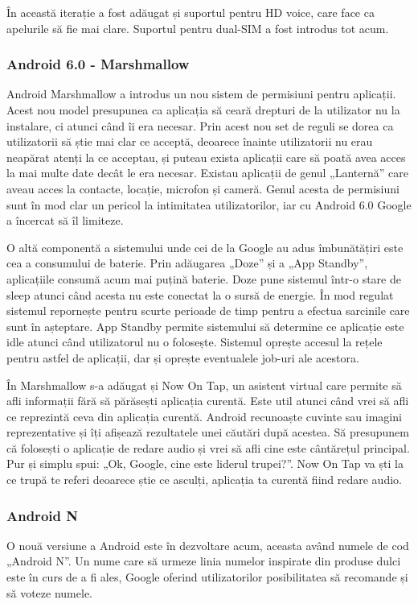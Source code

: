 \documentclass[12pt,a4paper]{article}
\begin{document}
	În această iterație a fost adăugat și suportul pentru HD voice, care face ca apelurile să fie mai clare. Suportul pentru dual-SIM a fost introdus tot acum.

	
\subsubsection{Android 6.0 - Marshmallow}
Android Marshmallow a introdus un nou sistem de permisiuni pentru aplicații. Acest nou model presupunea ca aplicația să ceară drepturi de la utilizator nu la instalare, ci atunci când îi era necesar. Prin acest nou set de reguli se dorea ca utilizatorii să știe mai clar ce acceptă, deoarece înainte utilizatorii nu erau neapărat atenți la ce acceptau, și puteau exista aplicații care să poată avea acces la mai multe date decât le era necesar. Existau aplicații de genul „Lanternă” care aveau acces la contacte, locație, microfon și cameră. Genul acesta de permisiuni sunt în mod clar un pericol la intimitatea utilizatorilor, iar cu Android 6.0 Google a încercat să îl limiteze.

	O altă componentă a sistemului unde cei de la Google au adus îmbunătățiri este cea a consumului de baterie. Prin adăugarea „Doze” și a „App Standby”, aplicațiile consumă acum mai puțină baterie. Doze pune sistemul într-o stare de sleep atunci când acesta nu este conectat la o sursă de energie. În mod regulat sistemul repornește pentru scurte perioade de timp pentru a efectua sarcinile care sunt în așteptare. App Standby permite sistemului să determine ce aplicație este idle atunci când utilizatorul nu o folosește. Sistemul oprește accesul la rețele pentru astfel de aplicații, dar și oprește eventualele job-uri ale acestora.

	În Marshmallow s-a adăugat și Now On Tap, un asistent virtual care permite să afli informații fără să părăsești aplicația curentă. Este util atunci când vrei să afli ce reprezintă ceva din aplicația curentă. Android recunoaște cuvinte sau imagini reprezentative și îți afișează rezultatele unei căutări după acestea. Să presupunem că folosești o aplicație de redare audio și vrei să afli cine este cântărețul principal. Pur și simplu spui: „Ok, Google, cine este liderul trupei?”. Now On Tap va ști la ce trupă te referi deoarece știe ce asculți, aplicația ta curentă fiind redare audio.


\subsubsection{Android N}
O nouă versiune a Android este în dezvoltare acum, aceasta având numele de cod „Android N”. Un nume care să urmeze linia numelor inspirate din produse dulci este în curs de a fi ales, Google oferind utilizatorilor posibilitatea să recomande și să voteze numele.
	
\end{document}
